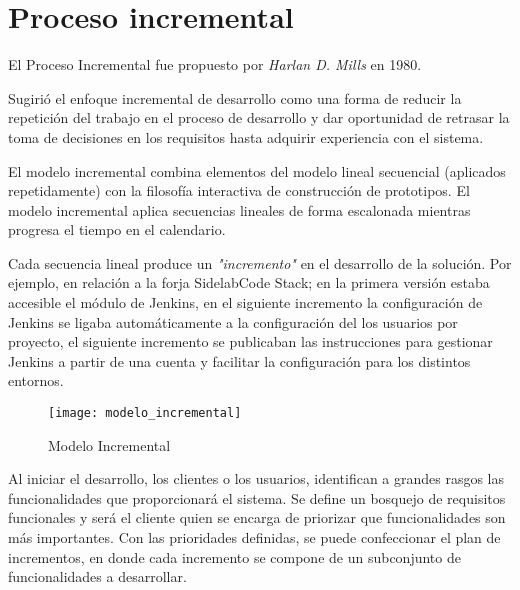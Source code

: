 
\section{Proceso incremental}
\label{sec:proc-incremental}

\par El Proceso Incremental fue propuesto por \emph{Harlan D. Mills} en 1980.

\par Sugirió el enfoque incremental de desarrollo como una forma de reducir la repetición del trabajo en el proceso de desarrollo y dar oportunidad de retrasar la toma de decisiones en los requisitos hasta adquirir experiencia con el sistema.

\par El modelo incremental combina elementos del modelo lineal secuencial (aplicados repetidamente) con la filosofía interactiva de construcción de prototipos. El modelo incremental aplica secuencias lineales de forma escalonada mientras progresa el tiempo en el calendario.

\par Cada secuencia lineal produce un \emph{"incremento"} en el desarrollo de la solución. Por ejemplo, en relación a la forja SidelabCode Stack; en la primera versión estaba accesible el módulo de Jenkins, en el siguiente incremento la configuración de Jenkins se ligaba automáticamente a la configuración del los usuarios por proyecto, el siguiente incremento se publicaban las instrucciones para gestionar Jenkins a partir de una cuenta y facilitar la configuración para los distintos entornos.

\begin{figure}[H]
    \centering
    \texttt{[image: modelo\_incremental]}
    \caption{Modelo Incremental}
    \label{fig:modelo-incremental}
\end{figure}

\par Al iniciar el desarrollo, los clientes o los usuarios, identifican a grandes rasgos las funcionalidades que proporcionará el sistema. Se define un bosquejo de requisitos funcionales y será el cliente quien se encarga de priorizar que funcionalidades son más importantes. Con las prioridades definidas, se puede confeccionar el plan de incrementos, en donde cada incremento se compone de un subconjunto de funcionalidades a desarrollar.


